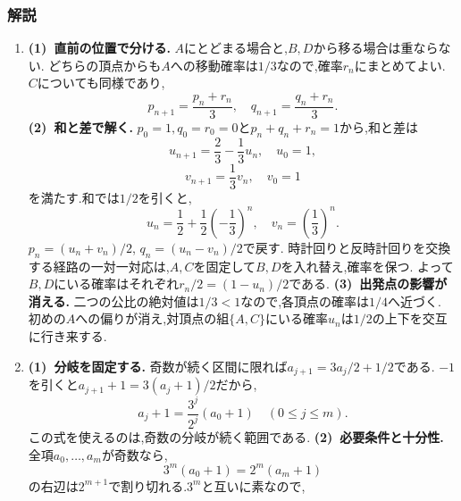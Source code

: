       \subsubsection{解説}\label{節：発展難易度：解法}\label{節：大学過去問ベースのもの：解法}
        \begin{enumerate}[label=\textbf{問\arabic*.},leftmargin=3.8em,format=\bookitemlink{practice-entrance}{solution}{problem}]
          \item \textbf{(1)~直前の位置で分ける.}
                  $A$にとどまる場合と,$B,D$から移る場合は重ならない.
                  どちらの頂点からも$A$への移動確率は$1/3$なので,確率$r_n$にまとめてよい.
                  $C$についても同様であり,
                  \[
                    p_{n+1}=\frac{p_n+r_n}3,\quad q_{n+1}=\frac{q_n+r_n}3.
                  \]
                  \smallskip\textbf{(2)~和と差で解く.}
                  $p_0=1,q_0=r_0=0$と$p_n+q_n+r_n=1$から,和と差は
                  \[
                    u_{n+1}=\frac23-\frac13u_n,\quad u_0=1,
                  \]
                  \[
                    v_{n+1}=\frac13v_n,\quad v_0=1
                  \]
                  を満たす.和では$1/2$を引くと,
                  \[
                    u_n=\frac12+\frac12\left(-\frac13\right)^n,\quad
                    v_n=\left(\frac13\right)^n.
                  \]
                  $p_n=(u_n+v_n)/2$, $q_n=(u_n-v_n)/2$で戻す.
                  時計回りと反時計回りを交換する経路の一対一対応は,$A,C$を固定して$B,D$を入れ替え,確率を保つ.
                  よって$B,D$にいる確率はそれぞれ$r_n/2=(1-u_n)/2$である.
                  \smallskip\textbf{(3)~出発点の影響が消える.}
                  二つの公比の絶対値は$1/3<1$なので,各頂点の確率は$1/4$へ近づく.
                  初めの$A$への偏りが消え,対頂点の組$\{A,C\}$にいる確率$u_n$は$1/2$の上下を交互に行き来する.
          \item \textbf{(1)~分岐を固定する.}
                  奇数が続く区間に限れば$a_{j+1}=3a_j/2+1/2$である.
                  $-1$を引くと$a_{j+1}+1=3(a_j+1)/2$だから,
                  \[
                    a_j+1=\frac{3^j}{2^j}(a_0+1)\quad(0\le j\le m).
                  \]
                  この式を使えるのは,奇数の分岐が続く範囲である.
                  \smallskip\textbf{(2)~必要条件と十分性.}
                  全項$a_0,\ldots,a_m$が奇数なら,
                  \[
                    3^m(a_0+1)=2^m(a_m+1)
                  \]
                  の右辺は$2^{m+1}$で割り切れる.$3^m$と互いに素なので,

\end{enumerate}
